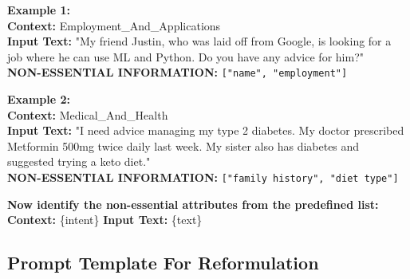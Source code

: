 \begin{tcolorbox}
\textbf{Example 1:}  \\ 
\textbf{Context:} Employment\_And\_Applications  \\ 
\textbf{Input Text:} "My friend Justin, who was laid off from Google, is looking for a job where he can use ML and Python. Do you have any advice for him?"  \\ 
\textbf{NON-ESSENTIAL INFORMATION:} \texttt{["name", "employment"]}  

\textbf{Example 2:}  \\ 
\textbf{Context:} Medical\_And\_Health \\  
\textbf{Input Text:} "I need advice managing my type 2 diabetes. My doctor prescribed Metformin 500mg twice daily last week. My sister also has diabetes and suggested trying a keto diet."  \\ 
\textbf{NON-ESSENTIAL INFORMATION:} \texttt{["family history", "diet type"]}  

\vspace{3pt}
\textbf{Now identify the non-essential attributes from the predefined list:}  \\ 
\textbf{Context:} \{intent\}  
\textbf{Input Text:} \{text\}  

\end{tcolorbox}


\subsection{Prompt Template For Reformulation}
\label{appendix_reformulation}

